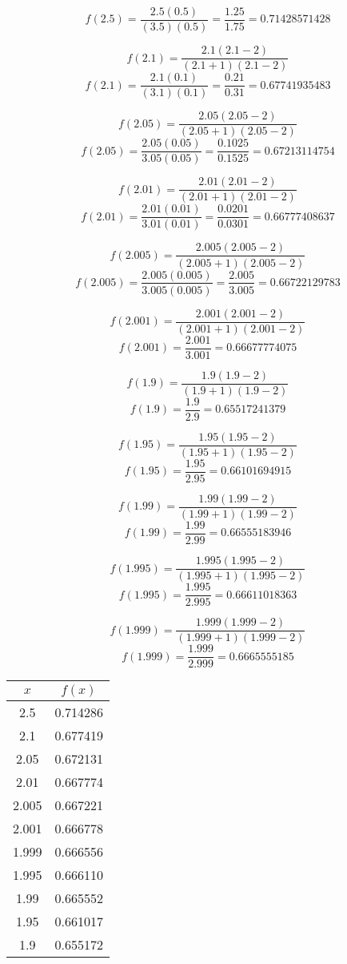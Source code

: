 \documentclass{article}
\begin{document}
\begin{enumerate}
			  $$f(2.5) = \frac{2.5(0.5)}{(3.5)(0.5)} = \frac{1.25}{1.75} = 0.71428571428$$
			  
			  $$f(2.1) = \frac{2.1(2.1 - 2)}{(2.1 + 1)(2.1 - 2)}$$
			  $$f(2.1) = \frac{2.1(0.1)}{(3.1)(0.1)} = \frac{0.21}{0.31} = 0.67741935483$$
			  
			  $$f(2.05) = \frac{2.05(2.05 - 2)}{(2.05 + 1)(2.05 - 2)}$$
			  $$f(2.05) = \frac{2.05(0.05)}{3.05(0.05)} = \frac{0.1025}{0.1525} = 0.67213114754$$
			  
			  $$f(2.01) = \frac{2.01(2.01 - 2)}{(2.01 + 1)(2.01 - 2)}$$
			  $$f(2.01) = \frac{2.01(0.01)}{3.01(0.01)} = \frac{0.0201}{0.0301} = 0.66777408637$$
			  
			  $$f(2.005) = \frac{2.005(2.005 - 2)}{(2.005 + 1)(2.005 - 2)} $$ 
			  $$f(2.005) = \frac{2.005(0.005)}{3.005(0.005)} = \frac{2.005}{3.005} = 0.66722129783$$
			  
			  $$f(2.001) = \frac{2.001(2.001 - 2)}{(2.001 + 1)(2.001 - 2)}$$
			  $$f(2.001) = \frac{2.001}{3.001} = 0.66677774075$$
			  
			  $$f(1.9) = \frac{1.9(1.9 - 2)}{(1.9 + 1)(1.9 - 2)}$$
			  $$f(1.9) = \frac{1.9}{2.9} = 0.65517241379$$
			  
			  $$f(1.95) = \frac{1.95(1.95 - 2)}{(1.95 + 1)(1.95 - 2)}$$
			  $$f(1.95) = \frac{1.95}{2.95} = 0.66101694915$$
			  
			  $$f(1.99) = \frac{1.99(1.99 - 2)}{(1.99 + 1)(1.99 - 2)}$$
			  $$f(1.99) = \frac{1.99}{2.99} = 0.66555183946$$
			  
			  $$f(1.995) = \frac{1.995(1.995 - 2)}{(1.995 + 1)(1.995 - 2)}$$
			  $$f(1.995) = \frac{1.995}{2.995} = 0.66611018363$$
			  
			  $$f(1.999) = \frac{1.999(1.999 - 2)}{(1.999 + 1)(1.999 - 2)}$$
			  $$f(1.999) = \frac{1.999}{2.999} = 0.6665555185$$
\begin{center}
			  \begin{tabular}{|c|c|}
			  	\hline
			  	$x$ & $f(x)$ \\
			  	\hline \hline			  	
			  	2.5 & 0.714286 \\
			  	2.1 &  0.677419 \\
			  	2.05 &  0.672131 \\
			  	2.01 &  0.667774 \\
			  	2.005 &  0.667221 \\
			  	2.001 & 0.666778 \\
			  	1.999 &  0.666556 \\
			  	1.995 & 0.666110 \\
			  	1.99 & 0.665552 \\
			  	1.95 &  0.661017 \\
			  	1.9 &  0.655172 \\
			  	\hline
			  \end{tabular}
\end{center}


\end{enumerate}
\end{document}

